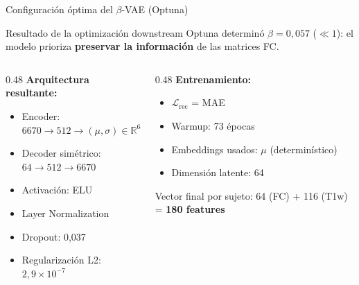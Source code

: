 \documentclass[aspectratio=169, 11pt]{beamer}
\newcommand{\highlight}[1]{\textcolor{uncaccent}{\textbf{#1}}}
\begin{document}
\begin{frame}{Configuración óptima del $\beta$-VAE (Optuna)}
  \begin{block}{Resultado de la optimización downstream}
    {\small Optuna determinó $\beta = 0{,}057$ ($\ll 1$): el modelo prioriza \highlight{preservar la información} de las matrices FC.}
  \end{block}

  \vspace{0.2cm}
  \begin{columns}[T]
    \begin{column}{0.48\textwidth}
      {\small \textbf{Arquitectura resultante:}}
      \begin{itemize}
        \item Encoder: $6670 \to 512 \to (\mu, \sigma) \in \mathbb{R}^{64}$
        \item Decoder simétrico: $64 \to 512 \to 6670$
        \item Activación: ELU
        \item Layer Normalization
        \item Dropout: 0,037
        \item Regularización L2: $2{,}9 \times 10^{-7}$
      \end{itemize}
    \end{column}
    \begin{column}{0.48\textwidth}
      {\small \textbf{Entrenamiento:}}
      \begin{itemize}
        \item $\mathcal{L}_{\text{rec}}$ = MAE
        \item Warmup: 73 épocas
        \item Embeddings usados: $\mu$ (determinístico)
        \item Dimensión latente: 64
      \end{itemize}

      \vspace{0.2cm}
      {\scriptsize Vector final por sujeto: 64 (FC) + 116 (T1w) = \highlight{180 features}}
    \end{column}
  \end{columns}
\end{frame}
\end{document}
